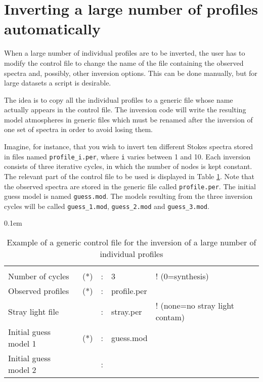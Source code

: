\section{Inverting a large number of profiles automatically}
\label{corremuchos}
When a large number of individual profiles are to be inverted, the
user has to modify the control file to change the name of the 
file containing the observed spectra and, possibly, other inversion
options. This can be done manually, but for large datasets a 
script is desirable.  

The idea is to copy all the individual profiles to a generic file whose
name actually appears in the control file. The inversion code will write the
resulting model atmospheres in generic files which must be renamed
after the inversion of one set of spectra in order to avoid losing them.

Imagine, for instance, that you wish to invert ten 
different Stokes spectra stored in files named {\tt profile\_i.per}, 
where {\tt i} varies between 1 and 10. Each inversion consists of
three iterative cycles, in which the number of nodes is kept constant. 
The relevant part of the control file to be used is displayed in
Table \ref{multiple}. Note that the observed spectra are stored in
the generic file called {\tt profile.per}. The initial guess model is named
{\tt guess.mod}. The models resulting from the three inversion
cycles will be called {\tt guess\_1.mod}, {\tt guess\_2.mod} and
{\tt guess\_3.mod}. 


\begin{table}[t]
\small
\tabcolsep 0.1em
\caption{Example of a generic control file for the inversion of a large number
of individual profiles}
\label{multiple}
\begin{tabular}{lrcll}
 &  & &            &       \\
Number of cycles          &(*)&:&3             &! (0=synthesis)  \\
Observed profiles         &(*)&:&profile.per &             \\
Stray light file          &   &:&stray.per    & ! (none=no stray light contam)\\
Initial guess model 1     &(*)&:&guess.mod   &\\
Initial guess model 2     &   &:&           &\\
\end{tabular}
\end{table}


